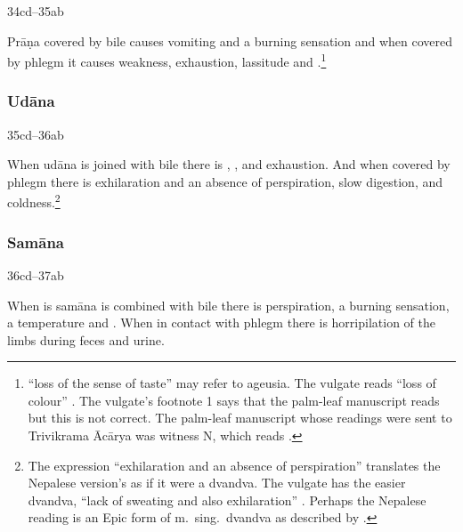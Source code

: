 \begin{translation}
\item[34cd--35ab]

Prāṇa covered by bile causes vomiting and a burning sensation and when
covered by phlegm it causes weakness, exhaustion, lassitude and
.\footnote{ “loss of
    the sense of taste” may refer to ageusia.  The vulgate reads
     “loss of colour” \citep[263]{vulgate}.  The vulgate's
    footnote 1 says that the palm-leaf manuscript reads  
    but this is not correct.  The palm-leaf manuscript whose readings were
    sent to Trivikrama Ācārya was witness N, which reads .}


\subsubsection{Udāna}

\item[35cd--36ab]

	When udāna is joined with bile there is ,
,  and exhaustion. And
when covered by phlegm there is exhilaration and an absence of
perspiration, slow digestion, and coldness.\footnote{The expression
    “exhilaration and an absence of perspiration” translates the Nepalese
    version's  as if it were a dvandva.  The vulgate
    has the easier dvandva,  “lack of sweating and also
    exhilaration” .  Perhaps the Nepalese reading is an
    Epic form of m.\ sing.\ dvandva as described by \citet[361--362,
    n.\,3]{ober-2003}.\label{masc-dvandva}}

    
\subsubsection{Samāna}
    
\item[36cd--37ab]

	When is samāna is combined with bile there is perspiration, a burning sensation,
	a temperature and . When in contact with phlegm 
    there is horripilation of the limbs during feces and urine.



\end{translation}

